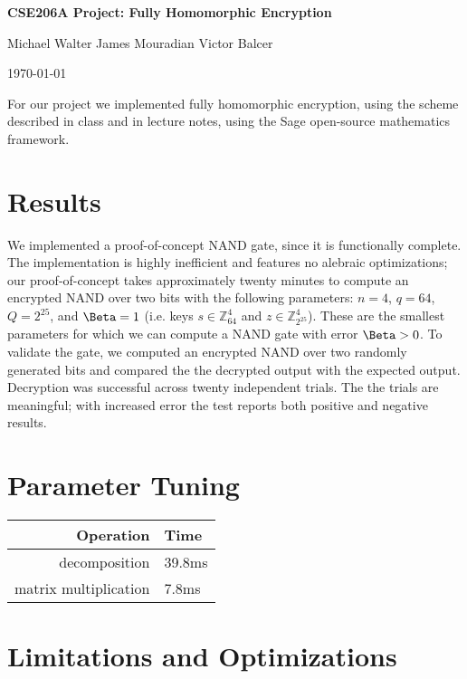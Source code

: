 \documentclass{article}
\begin{document}
\centerline{\LARGE{\bf{CSE206A Project: Fully Homomorphic Encryption}}}
\vspace{12.0pt}
\centerline{Michael Walter \hspace{0.1in} James Mouradian \hspace{0.1in} Victor Balcer}
\vspace{4.0pt}
\centerline{\today}

For our project we implemented fully homomorphic encryption, using the scheme
described in class and in lecture notes, using the Sage open-source mathematics
framework.

\section{Results}

We implemented a proof-of-concept NAND gate, since it is functionally complete.
The implementation is highly inefficient and features no alebraic
optimizations; our proof-of-concept takes approximately twenty minutes to
compute an encrypted NAND over two bits with the following parameters: $n=4$,
$q=64$, $Q=2^{25}$, and $\Beta=1$ (i.e. keys $s\in \mathbb{Z}_{64}^4$ and
$z\in\mathbb{Z}_{2^{25}}^4$). These are the smallest parameters for which we
can compute a NAND gate with error $\Beta > 0$. To validate the gate, we
computed an encrypted NAND over two randomly generated bits and compared the
the decrypted output with the expected output. Decryption was successful across
twenty independent trials. The the trials are meaningful; with increased error
the test reports both positive and negative results.

\section{Parameter Tuning}


\begin{tabular}{r   l}
\textbf{Operation} & \textbf{Time} \\
\hline
decomposition & 39.8ms \\
matrix multiplication & 7.8ms \\
\end{tabular}


\section{Limitations and Optimizations}
\end{document}

